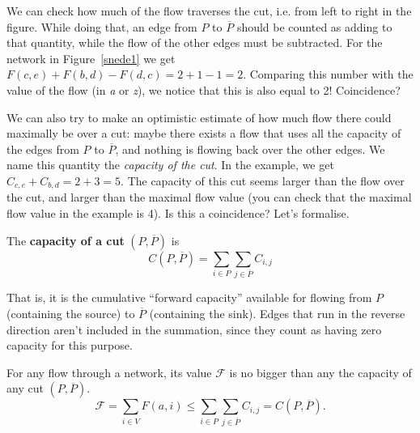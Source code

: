 We can check how much of the flow traverses the cut, i.e. from left to
right in the figure. While doing that, an edge from $P$ to
$\overline{P}$ should be counted as adding to that quantity,
while the flow of the other edges must be subtracted. For the network
in Figure~\ref{snede1} we get $F(c,e) + F(b,d) - F(d,c) = 2+1-1=2$. Comparing this number with the value of the flow (in {\em a} or {\em z}), we notice that this is also equal to 2! Coincidence?

We can also try to make an optimistic estimate of how much flow there
could maximally be over a cut: maybe there exists a flow that uses all
the capacity of the edges from $P$ to $\overline{P}$, and nothing is
flowing back over the other edges. We name this quantity the {\em
capacity of the cut}. In the example, we get $C_{c,e} + C_{b,d} = 2+3=5$.
The capacity of this cut seems larger than the flow over the cut, and
larger than the maximal flow value (you can check that the maximal flow value in
the example is 4). Is this a coincidence? Let's formalise.

 \begin{definition}
  \textup{The \textbf{capacity of a cut} $(P,\overline{P})$ is}
	\begin{equation*}
		C(P,\overline{P}) = \displaystyle \sum_{i \in P} \sum_{j \in \overline{P}} C_{i,j}
	\end{equation*}
\end{definition}
That is, it is the cumulative ``forward capacity'' available for flowing from $P$ (containing the source) to $\overline P$ (containing the sink). Edges that run in the reverse direction aren't included in the summation, since they count as having zero capacity for this purpose.

\begin{theorem} \label{snedeflow}
For any flow through a network, its value $\mathcal{F}$ is no bigger than any the capacity of any cut $(P,\overline P)$.
\begin{equation*}
	\mathcal{F} = \sum_{i \in V} F(a,i) \leq \sum_{i \in P} \sum_{j \in \overline{P}} C_{i,j} = C(P,\overline P).
\end{equation*}
\end{theorem}

